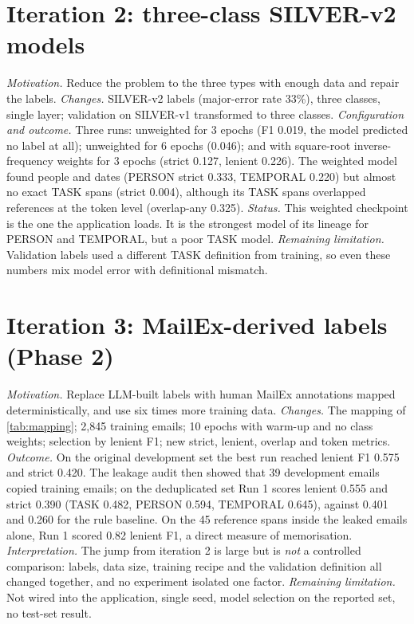 \section{Iteration 2: three-class SILVER-v2 models}
\textit{Motivation.} Reduce the problem to the three types with enough data and repair the labels.
\textit{Changes.} SILVER-v2 labels (major-error rate 33\%), three classes, single layer; validation on SILVER-v1 transformed to three classes.
\textit{Configuration and outcome.} Three runs: unweighted for 3 epochs (F1 0.019, the model predicted no  label at all); unweighted for 6 epochs (0.046); and with square-root inverse-frequency weights for 3 epochs (strict 0.127, lenient 0.226). The weighted model found people and dates (PERSON strict 0.333, TEMPORAL 0.220) but almost no exact TASK spans (strict 0.004), although its TASK spans overlapped references at the token level (overlap-any 0.325).
\textit{Status.} This weighted checkpoint is the one the application loads. It is the strongest model of its lineage for PERSON and TEMPORAL, but a poor TASK model.
\textit{Remaining limitation.} Validation labels used a different TASK definition from training, so even these numbers mix model error with definitional mismatch.

\section{Iteration 3: MailEx-derived labels (Phase 2)}
\textit{Motivation.} Replace LLM-built labels with human MailEx annotations mapped deterministically, and use six times more training data.
\textit{Changes.} The mapping of \cref{tab:mapping}; 2,845 training emails; 10 epochs with warm-up and no class weights; selection by lenient F1; new strict, lenient, overlap and token metrics.
\textit{Outcome.} On the original development set the best run reached lenient F1 0.575 and strict 0.420. The leakage audit then showed that 39 development emails copied training emails; on the deduplicated set Run 1 scores lenient 0.555 and strict 0.390 (TASK 0.482, PERSON 0.594, TEMPORAL 0.645), against 0.401 and 0.260 for the rule baseline. On the 45 reference spans inside the leaked emails alone, Run 1 scored 0.82 lenient F1, a direct measure of memorisation.
\textit{Interpretation.} The jump from iteration 2 is large but is \emph{not} a controlled comparison: labels, data size, training recipe and the validation definition all changed together, and no experiment isolated one factor.
\textit{Remaining limitation.} Not wired into the application, single seed, model selection on the reported set, no test-set result.

